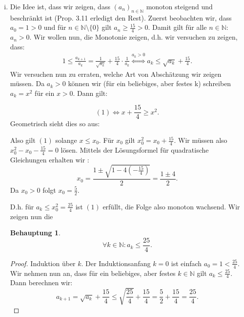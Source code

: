 \documentclass[a4paper, 20]{exam}
\newtheorem{claim}{Behauptung}
\newcommand\NN{\mathbb{N}}
\begin{document}
\begin{solution}
\begin{enumerate}[i.)]
\item
Die Idee ist, dass wir zeigen, dass $(a_n)_{n\in \NN}$ monoton steigend und beschr\"ankt ist (Prop. 3.11 erledigt den Rest).
Zuerst beobachten wir, dass $a_0=1>0$ und f\"ur $n\in \NN\setminus \{0\}$ gilt $a_{n}\geq \frac{15}{4}>0$. Damit gilt f\"ur alle $n\in \NN$: $a_n>0$.
Wir wollen nun, die Monotonie zeigen, d.h. wir versuchen zu zeigen, dass:
\begin{align}
1\leq \frac{a_{k+1}}{a_k} = \frac{1}{\sqrt{a_k}} + \frac{15}{4}\cdot \frac{1}{a_k}
\stackrel{a_k>0}{\Longleftrightarrow} a_k \leq \sqrt{a_k} + \frac{15}{4} .
\end{align} 
Wir versuchen nun zu erraten, welche Art von Absch\"atzung wir zeigen m\"ussen. Da $a_k>0$ k\"onnen wir (f\"ur ein beliebiges, aber festes k) schreiben $a_k= x^2$ f\"ur ein $x>0$. Dann gilt:

$$ (1) \Longleftrightarrow x+\frac{15}{4} \geq x^2.$$
Geometrisch sieht dies so aus:
\begin{center}
\end{center}

Also gilt $(1)$ solange $x\leq x_0$. F\"ur $x_0$ gilt $x_0^2= x_0+\frac{15}{4}$. Wir m\"ussen also $x_0^2-x_0-\frac{15}{4}=0$ l\"osen. Mittels der L\"osungsformel f\"ur quadratische Gleichungen erhalten wir :
$$x_0= \frac{1 \pm \sqrt{1-4(-\frac{15}{4})}}{2}=\frac{1\pm 4}{2}.$$
Da $x_0>0$ folgt $x_0=\frac{5}{2}$.

D.h. f\"ur $a_k\leq x_0^2= \frac{25}{4}$ ist $(1)$ erf\"ullt, die Folge also monoton wachsend. Wir zeigen nun die
\begin{claim}
$$\forall k\in \NN: a_k \leq \frac{25}{4}.$$
\end{claim}
\begin{proof}
Induktion \"uber $k$. Der Induktionsanfang $k=0$ ist einfach $a_0=1<\frac{25}{4}$. Wir nehmen nun an, dass f\"ur ein beliebiges, aber festes $k\in \NN$ gilt $a_k \leq \frac{25}{4}$. Dann berechnen wir:
$$ a_{k+1} = \sqrt{a_k} + \frac{15}{4} 
\leq \sqrt{\frac{25}{4}} + \frac{15}{4}
= \frac{5}{2} + \frac{15}{4} = \frac{25}{4}.$$


\end{proof}
\end{enumerate}
\end{solution}
\end{document}
